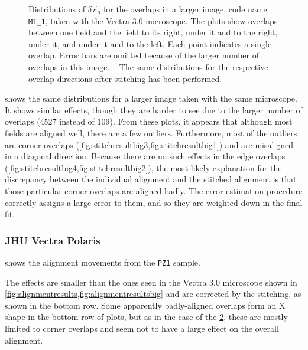 \documentclass{article}
\newcommand{\M}[2]{\texttt{M#1\_#2}}
\begin{document}
\begin{figure}[ht]
\begin{subfigure}{0.24\linewidth}
		\caption{}
		\label{fig:stitchresultbig1}
	\end{subfigure}
	\caption{Distributions of $\delta\vec{r}_o$ for the overlaps in a larger image, code name \M11, taken with the Vectra 3.0 microscope.  The plots show overlaps between one field and the field  to its right,  under it and to the right,  under it, and  under it and to the left.  Each point indicates a single overlap.  Error bars are omitted because of the larger number of overlaps in this image.  -- The same distributions for the respective overlap directions after stitching has been performed.}
	\label{fig:alignmentresultsbig}
\end{figure}

 shows the same distributions for a larger image taken with the same microscope.  It shows similar effects, though they are harder to see due to the larger number of overlaps ($4527$ instead of $109$).  From these plots, it appears that although most fields are aligned well, there are a few outliers.  Furthermore, most of the outliers are corner overlaps (\cref{fig:stitchresultbig3,fig:stitchresultbig1}) and are misaligned in a diagonal direction.  Because there are no such effects in the edge overlaps (\cref{fig:stitchresultbig4,fig:stitchresultbig2}), the most likely explanation for the discrepancy between the individual alignment and the stitched alignment is that those particular corner overlaps are aligned badly.  The error estimation procedure correctly assigns a large error to them, and so they are weighted down in the final fit.

\clearpage

\subsubsection{JHU Vectra Polaris}

 shows the alignment movements from the \texttt{PZ1} sample.

The effects are smaller than the ones seen in the Vectra 3.0 microscope shown in \cref{fig:alignmentresults,fig:alignmentresultsbig} and are corrected by the stitching, as shown in the bottom row.  Some apparently badly-aligned overlaps form an X shape in the bottom row of plots, but as in the case of the \cref{fig:alignmentresultsbig}, these are mostly limited to corner overlaps and seem not to have a large effect on the overall alignment.
\end{document}
